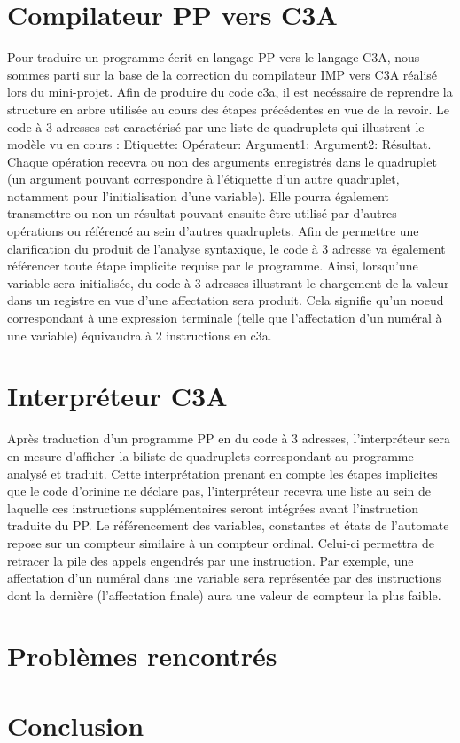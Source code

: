\documentclass[11pt,a4paper]{article}
\begin{document}
\section{Compilateur PP vers C3A}
Pour traduire un programme écrit en langage PP vers le langage C3A, nous sommes parti sur la base de la correction du compilateur IMP vers C3A réalisé lors du mini-projet.
Afin de produire du code c3a, il est necéssaire de reprendre la structure en arbre utilisée au cours des étapes précédentes en vue de la revoir.
Le code à 3 adresses est caractérisé par une liste de quadruplets qui illustrent le modèle vu en cours :
Etiquette: Opérateur: Argument1: Argument2: Résultat.
Chaque opération recevra ou non des arguments enregistrés dans le quadruplet (un argument pouvant correspondre à l'étiquette d'un autre quadruplet, notamment pour l'initialisation d'une variable).
Elle pourra également transmettre ou non un résultat pouvant ensuite être utilisé par d'autres opérations ou référencé au sein d'autres quadruplets.
Afin de permettre une clarification du produit de l'analyse syntaxique, le code à 3 adresse va également référencer toute étape implicite requise par le programme.
Ainsi, lorsqu'une variable sera initialisée, du code à 3 adresses illustrant le chargement de la valeur dans un registre en vue d'une affectation sera produit.
Cela signifie qu'un noeud correspondant à une expression terminale (telle que l'affectation d'un numéral à une variable) équivaudra à 2 instructions en c3a.

\section{Interpréteur C3A}
Après traduction d'un programme PP en du code à 3 adresses, l'interpréteur sera en mesure d'afficher la biliste de quadruplets correspondant au programme analysé et traduit.
Cette interprétation prenant en compte les étapes implicites que le code d'orinine ne déclare pas, l'interpréteur recevra une liste au sein de laquelle ces instructions supplémentaires seront intégrées avant l'instruction traduite du PP.
Le référencement des variables, constantes et états de l'automate repose sur un compteur similaire à un compteur ordinal.
Celui-ci permettra de retracer la pile des appels engendrés par une instruction.
Par exemple, une affectation d'un numéral dans une variable sera représentée par des instructions dont la dernière (l'affectation finale) aura une valeur de compteur la plus faible.

\section{Problèmes rencontrés}


\section{Conclusion}
\end{document}
